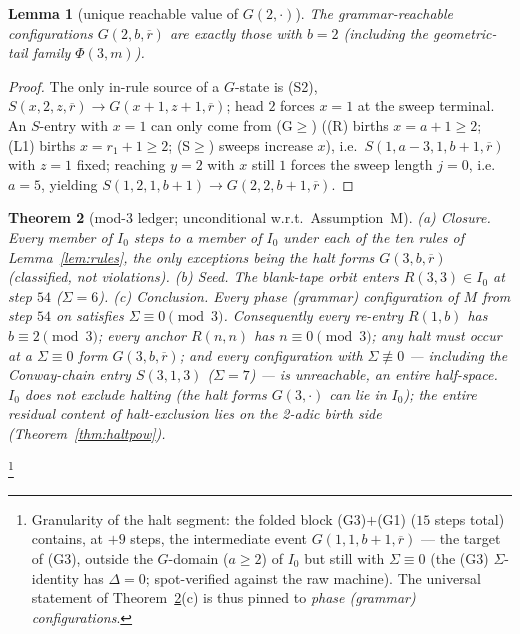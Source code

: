 \documentclass[11pt]{amsart}
\newtheorem{theorem}{Theorem}[section]
\newtheorem{lemma}[theorem]{Lemma}
\theoremstyle{definition}
\begin{document}
\begin{lemma}[unique reachable value of $G(2,\cdot)$]\label{lem:g22}
The grammar-reachable configurations $G(2,b,\overline r)$ are exactly those
with $b=2$ (including the geometric-tail family $\Phi(3,m)$).
\end{lemma}
\begin{proof}
The only in-rule source of a $G$-state is (S2),
$S(x,2,z,\overline r)\to G(x{+}1,z{+}1,\overline r)$; head $2$ forces $x=1$ at
the sweep terminal. An $S$-entry with $x=1$ can only come from (G$\ge$)
((R) births $x=a{+}1\ge2$; (L1) births $x=r_1{+}1\ge2$; (S$\ge$) sweeps
increase $x$), i.e.\ $S(1,a{-}3,1,b{+}1,\overline r)$ with $z=1$ fixed;
reaching $y=2$ with $x$ still $1$ forces the sweep length $j=0$, i.e.\ $a=5$,
yielding $S(1,2,1,b{+}1)\to G(2,2,b{+}1,\overline r)$.
\end{proof}

\begin{theorem}[mod-3 ledger; unconditional w.r.t.\ Assumption~M]\label{thm:mod3}
(a) \emph{Closure.} Every member of $I_0$ steps to a member of $I_0$ under
each of the ten rules of Lemma~\ref{lem:rules}, the only exceptions being the
halt forms $G(3,b,\overline r)$ (classified, not violations).
(b) \emph{Seed.} The blank-tape orbit enters $R(3,3)\in I_0$ at step $54$
($\Sigma=6$). (c) \emph{Conclusion.} Every phase (grammar) configuration of
$M$ from step $54$ on satisfies $\Sigma\equiv0\pmod3$. Consequently every
re-entry $R(1,b)$ has $b\equiv2\pmod3$; every anchor $R(n,n)$ has
$n\equiv0\pmod3$; any halt must occur at a $\Sigma\equiv0$ form
$G(3,b,\overline r)$; and every configuration with $\Sigma\not\equiv0$ ---
including the Conway-chain entry $S(3,1,3)$ ($\Sigma=7$) --- is unreachable,
an entire half-space. $I_0$ does not exclude halting (the halt forms
$G(3,\cdot)$ can lie in $I_0$); the entire residual content of
halt-exclusion lies on the 2-adic birth side (Theorem~\ref{thm:haltpow}).
\end{theorem}
\footnote{Granularity of the halt segment: the folded block
(G3)$+$(G1) ($15$ steps total) contains, at $+9$ steps, the intermediate
event $G(1,1,b{+}1,\overline r)$ --- the target of (G3), outside the
$G$-domain ($a\ge2$) of $I_0$ but still with $\Sigma\equiv0$ (the (G3)
$\Sigma$-identity has $\Delta=0$; spot-verified against the raw machine). The
universal statement of Theorem~\ref{thm:mod3}(c) is thus pinned to
\emph{phase (grammar) configurations}.}
\end{document}
